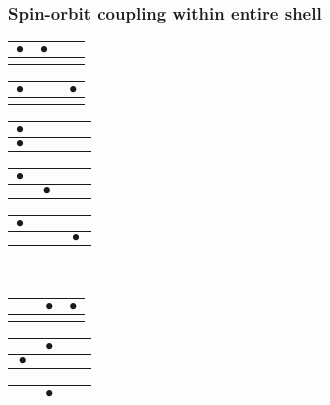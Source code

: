 \begin{frame}[t]
  \frametitle{Spin-orbit coupling within entire shell}
  \footnotesize
  \begin{center}
  \vspace{-0.5em}
  \begin{tabular}{|c|c|c|}
  \hline
  $\bullet$ & $\bullet$ & $\phantom{\bullet}$ \\ \hline
  &  &  \\
  \hline
  \end{tabular}
  \begin{tabular}{|c|c|c|}
  \hline
  $\bullet$ & $\phantom{\bullet}$ & $\bullet$ \\ \hline
  &  &  \\
  \hline
  \end{tabular}
  \begin{tabular}{|c|c|c|}
  \hline
  $\bullet$ & $\phantom{\bullet}$ & $\phantom{\bullet}$ \\ \hline
  $\bullet$ &  &  \\
  \hline
  \end{tabular}
  \begin{tabular}{|c|c|c|}
  \hline
  $\bullet$ & $\phantom{\bullet}$ & $\phantom{\bullet}$ \\ \hline
  & $\bullet$ &  \\
  \hline
  \end{tabular}
  \begin{tabular}{|c|c|c|}
  \hline
  $\bullet$ & $\phantom{\bullet}$ & $\phantom{\bullet}$ \\ \hline
  &  & $\bullet$ \\
  \hline
  \end{tabular} \\
  \vspace{0.5em}
  \begin{tabular}{|c|c|c|}
  \hline
  $\phantom{\bullet}$ & $\bullet$ & $\bullet$ \\ \hline
  &  &  \\
  \hline
  \end{tabular}
  \begin{tabular}{|c|c|c|}
  \hline
  $\phantom{\bullet}$ & $\bullet$ & $\phantom{\bullet}$ \\ \hline
  $\bullet$ &  &  \\
  \hline
  \end{tabular}
  \begin{tabular}{|c|c|c|}
  \hline
  $\phantom{\bullet}$ & $\bullet$ & $\phantom{\bullet}$ \\ \hline

\end{tabular}
\end{center}
\end{frame}
